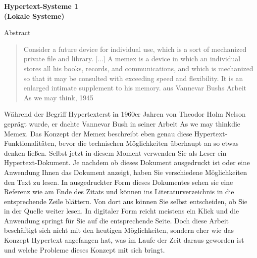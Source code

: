 \begin{centering}
\textbf { \LARGE
Hypertext-Systeme 1
\\(Lokale Systeme)
\\[1.2cm]
}
\end{centering}

{\large
Abstract
}

{

\begin{quote}
	\glqq Consider a future device for individual use, which is a sort of mechanized private file and library. [...] A memex is a device in which an individual stores all his books, records, and communications, and which is mechanized so that it may be consulted with exceeding speed and flexibility. It is an enlarged intimate supplement to his memory.\grqq{ } aus Vannevar Bushs Arbeit \glqq As we may think\grqq{ }, 1945\cite{Bush1945}
\end{quote}

Während der Begriff \glqq Hypertext\grqq{ }erst in 1960er Jahren von Theodor Holm Nelson \cite{Nelson1965} geprägt wurde, er dachte Vannevar Bush in seiner Arbeit \glqq As we may think\grqq{ }die Memex. Das Konzept der Memex beschreibt eben genau diese Hypertext-Funktionalitäten, bevor die technischen Möglichkeiten überhaupt an so etwas denken ließen. Selbst jetzt in diesem Moment verwenden Sie als Leser ein Hypertext-Dokument. Je nachdem ob dieses Dokument ausgedruckt ist oder eine Anwendung Ihnen das Dokument anzeigt, haben Sie verschiedene Möglichkeiten den Text zu lesen. In ausgedruckter Form dieses Dokumentes sehen sie eine Referenz wie am Ende des Zitats und können ins Literaturverzeichnis in die entsprechende Zeile blättern. Von dort aus können Sie selbst entscheiden, ob Sie in der Quelle weiter lesen. In digitaler Form reicht meistens ein Klick und die Anwendung springt für Sie auf die entsprechende Seite. Doch diese Arbeit beschäftigt sich nicht mit den heutigen Möglichkeiten, sondern eher wie das Konzept Hypertext angefangen hat, was im Laufe der Zeit daraus geworden ist und welche Probleme dieses Konzept mit sich bringt.

}
